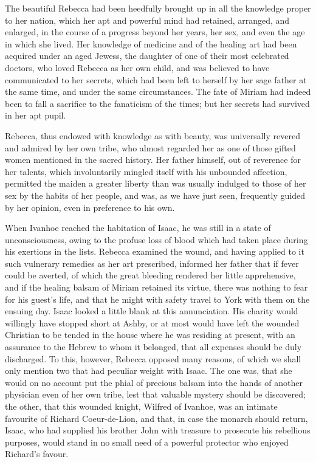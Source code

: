 The beautiful Rebecca had been heedfully brought up in all the knowledge
proper to her nation, which her apt and powerful mind had retained,
arranged, and enlarged, in the course of a progress beyond her years,
her sex, and even the age in which she lived. Her knowledge of medicine
and of the healing art had been acquired under an aged Jewess, the
daughter of one of their most celebrated doctors, who loved Rebecca as
her own child, and was believed to have communicated to her secrets,
which had been left to herself by her sage father at the same time, and
under the same circumstances. The fate of Miriam had indeed been to fall
a sacrifice to the fanaticism of the times; but her secrets had survived
in her apt pupil.

Rebecca, thus endowed with knowledge as with beauty, was universally
revered and admired by her own tribe, who almost regarded her as one of
those gifted women mentioned in the sacred history. Her father himself,
out of reverence for her talents, which involuntarily mingled itself
with his unbounded affection, permitted the maiden a greater liberty
than was usually indulged to those of her sex by the habits of her
people, and was, as we have just seen, frequently guided by her opinion,
even in preference to his own.

When Ivanhoe reached the habitation of Isaac, he was still in a state of
unconsciousness, owing to the profuse loss of blood which had taken
place during his exertions in the lists. Rebecca examined the wound, and
having applied to it such vulnerary remedies as her art prescribed,
informed her father that if fever could be averted, of which the great
bleeding rendered her little apprehensive, and if the healing balsam of
Miriam retained its virtue, there was nothing to fear for his guest's
life, and that he might with safety travel to York with them on the
ensuing day. Isaac looked a little blank at this annunciation. His
charity would willingly have stopped short at Ashby, or at most would
have left the wounded Christian to be tended in the house where he was
residing at present, with an assurance to the Hebrew to whom it
belonged, that all expenses should be duly discharged. To this, however,
Rebecca opposed many reasons, of which we shall only mention two that
had peculiar weight with Isaac. The one was, that she would on no
account put the phial of precious balsam into the hands of another
physician even of her own tribe, lest that valuable mystery should be
discovered; the other, that this wounded knight, Wilfred of Ivanhoe, was
an intimate favourite of Richard Coeur-de-Lion, and that, in case the
monarch should return, Isaac, who had supplied his brother John with
treasure to prosecute his rebellious purposes, would stand in no small
need of a powerful protector who enjoyed Richard's favour.

